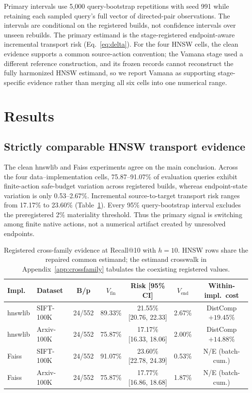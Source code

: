 \documentclass{article}
\begin{document}
Primary intervals use 5{,}000 query-bootstrap repetitions with seed 991 while retaining each sampled
query's full vector of directed-pair observations. The intervals are conditional on the registered builds,
not confidence intervals over unseen rebuilds. The primary estimand is the stage-registered endpoint-aware
incremental transport risk (Eq.~\ref{eq:delta}). For the four HNSW cells, the clean evidence supports a
common source-action convention; the Vamana stage used a different reference construction, and its frozen
records cannot reconstruct the fully harmonized HNSW estimand, so we report Vamana as supporting
stage-specific evidence rather than merging all six cells into one numerical range.

\section{Results}
\label{sec:results}

\subsection{Strictly comparable HNSW transport evidence}

The clean hnswlib and Faiss experiments agree on the main conclusion. Across the four data--implementation
cells, 75.87--91.07\% of evaluation queries exhibit finite-action safe-budget variation across registered
builds, whereas endpoint-state variation is only 0.53--2.67\%. Incremental source-to-target transport risk
ranges from 17.17\% to 23.60\% (Table~\ref{tab:crossfamily}). Every 95\% query-bootstrap interval excludes
the preregistered 2\% materiality threshold. Thus the primary signal is switching among finite native
actions, not a numerical artifact created by unresolved endpoints.

\begin{table}[t]
\centering
\caption{Registered cross-family evidence at Recall@10 with $h{=}10$. HNSW rows share the repaired common
estimand; the estimand crosswalk in Appendix~\ref{app:crossfamily} tabulates the coexisting registered
values.}
\label{tab:crossfamily}
\footnotesize
\setlength{\tabcolsep}{2.6pt}
\begin{tabular}{llccccc}
\toprule
Impl. & Dataset & B/p & $V_{\mathrm{fin}}$ & Risk [95\% CI] & $V_{\mathrm{end}}$ & Within-impl.\ cost \\
\midrule
hnswlib & SIFT-100K & 24/552 & 89.33\% & 21.55\% {\tiny[20.76, 22.33]} & 2.67\% & DistComp $+19.45\%$ \\
hnswlib & Arxiv-100K & 24/552 & 75.87\% & 17.17\% {\tiny[16.33, 18.06]} & 2.00\% & DistComp $+14.88\%$ \\
Faiss & SIFT-100K & 24/552 & 91.07\% & 23.60\% {\tiny[22.78, 24.39]} & 0.53\% & N/E (batch-cum.) \\
Faiss & Arxiv-100K & 24/552 & 75.87\% & 17.77\% {\tiny[16.86, 18.68]} & 1.87\% & N/E (batch-cum.) \\
\bottomrule
\end{tabular}
\end{table}
\end{document}
